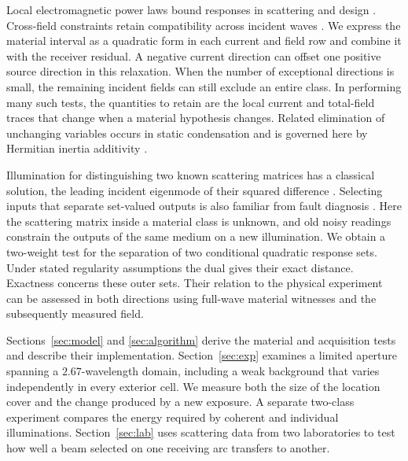 \documentclass[anonymous,12pt]{iopjournal}
\numberwithin{equation}{section}
\begin{document}
Local electromagnetic power laws bound responses in scattering and design \cite{kuang,trivedi,moleskylocal}. Cross-field constraints retain compatibility across incident waves \cite{shim}. We express the material interval as a quadratic form in each current and field row and combine it with the receiver residual. A negative current direction can offset one positive source direction in this relaxation. When the number of exceptional directions is small, the remaining incident fields can still exclude an entire class. In performing many such tests, the quantities to retain are the local current and total-field traces that change when a material hypothesis changes. Related elimination of unchanging variables occurs in static condensation \cite{huynh} and is governed here by Hermitian inertia additivity \cite{haynsworth}.

Illumination for distinguishing two known scattering matrices has a classical solution, the leading incident eigenmode of their squared difference \cite{bouchet}. Selecting inputs that separate set-valued outputs is also familiar from fault diagnosis \cite{scott}. Here the scattering matrix inside a material class is unknown, and old noisy readings constrain the outputs of the same medium on a new illumination. We obtain a two-weight test for the separation of two conditional quadratic response sets. Under stated regularity assumptions the dual gives their exact distance. Exactness concerns these outer sets. Their relation to the physical experiment can be assessed in both directions using full-wave material witnesses and the subsequently measured field.

Sections~\ref{sec:model} and \ref{sec:algorithm} derive the material and acquisition tests and describe their implementation. Section~\ref{sec:exp} examines a limited aperture spanning a $2.67$-wavelength domain, including a weak background that varies independently in every exterior cell. We measure both the size of the location cover and the change produced by a new exposure. A separate two-class experiment compares the energy required by coherent and individual illuminations. Section~\ref{sec:lab} uses scattering data from two laboratories to test how well a beam selected on one receiving arc transfers to another.







\end{document}

